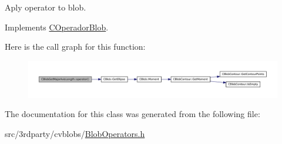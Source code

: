 Aply operator to blob. 



Implements \hyperlink{class_c_operador_blob_a303c4189cc94cafbcbee116bf014e623}{COperadorBlob}.



Here is the call graph for this function:
\nopagebreak
\begin{figure}[H]
\begin{center}
\leavevmode
\includegraphics[width=400pt]{class_c_blob_get_major_axis_length_a535c9a23d16bf020ed0c6aa9f36b884f_cgraph}
\end{center}
\end{figure}




The documentation for this class was generated from the following file:\begin{DoxyCompactItemize}
\item 
src/3rdparty/cvblobs/\hyperlink{_blob_operators_8h}{BlobOperators.h}\end{DoxyCompactItemize}
